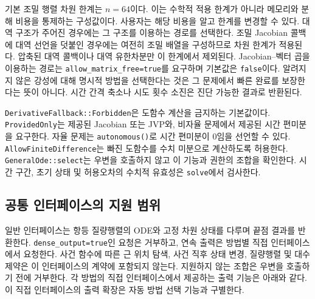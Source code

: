 \documentclass[
  10pt,
  dvipsnames]{article}
\begin{document}
기본 조밀 행렬 차원 한계는 \(n=64\)이다. 이는 수학적 적용 한계가 아니라
메모리와 분해 비용을 통제하는 구성값이다. 사용자는 해당 비용을 알고
한계를 변경할 수 있다. 대역 구조가 주어진 경우에는 그 구조를 이용하는
경로를 선택한다. 조밀 Jacobian 콜백에 대역 선언을 덧붙인 경우에는 여전히
조밀 배열을 구성하므로 차원 한계가 적용된다. 압축된 대역 콜백이나 대역
유한차분만 이 한계에서 제외된다. Jacobian--벡터 곱을 이용하는 경로는
\texttt{allow\_matrix\_free=true}를 요구하며 기본값은
\texttt{false}이다. 알려지지 않은 강성에 대해 명시적 방법을 선택한다는
것은 그 문제에서 빠른 완료를 보장한다는 뜻이 아니다. 시간 간격 축소나
시도 횟수 소진은 진단 가능한 결과로 반환된다.

\texttt{DerivativeFallback::Forbidden}은 도함수 계산을 금지하는
기본값이다. \texttt{ProvidedOnly}는 제공된 Jacobian 또는 JVP와, 비자율
문제에서 제공된 시간 편미분을 요구한다. 자율 문제는
\texttt{autonomous()}로 시간 편미분이 0임을 선언할 수 있다.
\texttt{AllowFiniteDifference}는 빠진 도함수를 수치 미분으로 계산하도록
허용한다. \texttt{GeneralOde::select}는 우변을 호출하지 않고 이 기능과
권한의 조합을 확인한다. 시간 구간, 초기 상태 및 허용오차의 수치적
유효성은 \texttt{solve}에서 검사한다.

\hypertarget{uxacf5uxd1b5-uxc778uxd130uxd398uxc774uxc2a4uxc758-uxc9c0uxc6d0-uxbc94uxc704}{%
\subsection{공통 인터페이스의 지원
범위}\label{uxacf5uxd1b5-uxc778uxd130uxd398uxc774uxc2a4uxc758-uxc9c0uxc6d0-uxbc94uxc704}}

일반 인터페이스는 항등 질량행렬의 ODE와 고정 차원 상태를 다루며 끝점
결과를 반환한다. \texttt{dense\_output=true}인 요청은 거부하고, 연속
출력은 방법별 직접 인터페이스에서 요청한다. 사건 함수에 따른 근 위치
탐색, 사건 직후 상태 변경, 질량행렬 및 대수 제약은 이 인터페이스의
계약에 포함되지 않는다. 지원하지 않는 조합은 우변을 호출하기 전에
거부한다. 각 방법의 직접 인터페이스에서 제공하는 출력 기능은 아래와
같다. 이 직접 인터페이스의 출력 확장은 자동 방법 선택 기능과 구별한다.
\end{document}

